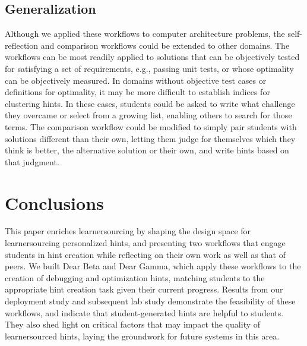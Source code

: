 \subsection{Generalization}
Although we applied these workflows to computer architecture problems, the self-reflection and comparison workflows could be extended to other domains. The workflows can be most readily applied to solutions that can be objectively tested for satisfying a set of requirements, e.g., passing unit tests, or whose optimality can be objectively measured. In domains without objective test cases or definitions for optimality, it may be more difficult to establish indices for clustering hints. In these cases, students could be asked to write what challenge they overcame or select from a growing list, enabling others to search for those terms. The comparison workflow could be modified to simply pair students with solutions different than their own, letting them judge for themselves which they think is better, the alternative solution or their own, and write hints based on that judgment.


\section{Conclusions}
This paper enriches learnersourcing by shaping the design space for learnersourcing personalized hints, and presenting two workflows that engage students in hint creation while reflecting on their own work as well as that of peers. We built Dear Beta and Dear Gamma, which apply these workflows to the creation of debugging and optimization hints, matching students to the appropriate hint creation task given their current progress. Results from our deployment study and subsequent lab study demonstrate the feasibility of these workflows, and indicate that student-generated hints are helpful to students. They also shed light on critical factors that may impact the quality of learnersourced hints, laying the groundwork for future systems in this area.